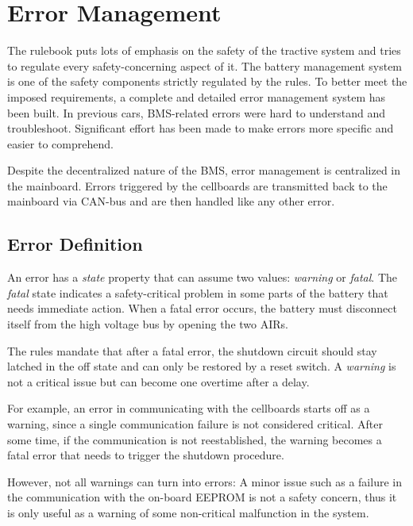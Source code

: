 \chapter{Error Management}
The rulebook puts lots of emphasis on the safety of the tractive system and tries to regulate every safety-concerning aspect of it. The battery management system is one of the safety components strictly regulated by the rules. To better meet the imposed requirements, a complete and detailed error management system has been built. In previous cars, BMS-related errors were hard to understand and troubleshoot. Significant effort has been made to make errors more specific and easier to comprehend.

Despite the decentralized nature of the BMS, error management is centralized in the mainboard. Errors triggered by the cellboards are transmitted back to the mainboard via CAN-bus and are then handled like any other error.

\section{Error Definition}
An error has a \textit{state} property that can assume two values: \textit{warning} or \textit{fatal}. The \textit{fatal} state indicates a safety-critical problem in some parts of the battery that needs immediate action. When a fatal error occurs, the battery must disconnect itself from the high voltage bus by opening the two AIRs.

The rules mandate that after a fatal error, the shutdown circuit should stay latched in the off state and can only be restored by a reset switch. A \textit{warning} is not a critical issue but can become one overtime after a delay.

For example, an error in communicating with the cellboards starts off as a warning, since a single communication failure is not considered critical. After some time, if the communication is not reestablished, the warning becomes a fatal error that needs to trigger the shutdown procedure.

However, not all warnings can turn into errors: A minor issue such as a failure in the communication with the on-board EEPROM is not a safety concern, thus it is only useful as a warning of some non-critical malfunction in the system.


